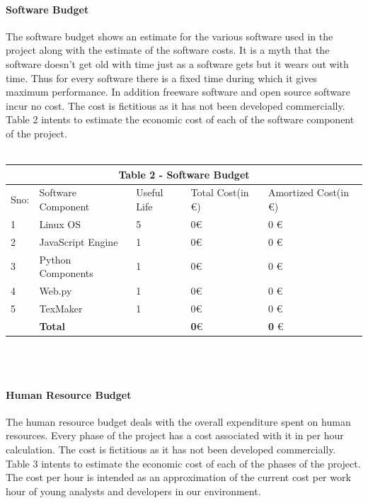 \paragraph{Software Budget}
The software budget shows an estimate for the various software used in the project along with
the estimate of the software costs. It is a myth that the software doesn’t get old with time just
as a software gets but it wears out with time. Thus for every software there is a fixed time
during which it gives maximum performance. In addition freeware software and open source
software incur no cost. The cost is fictitious as it has not been developed commercially. Table 2
intents to estimate the economic cost of each of the software component of the project.
\\ \\
\begin{tabular}{|p{1cm}||p{3cm}|p{2cm}|p{3cm}|p{3cm}|}
 \hline
 \multicolumn{5}{|c|}{Table 2 - Software Budget} \\
 \hline
 Sno: & Software Component&Useful Life &Total Cost(in \euro) &Amortized Cost(in \euro)\\
 \hline
1   & Linux OS  &5 &  0\euro  & 0 \euro \\
2   & JavaScript Engine  &1 &  0\euro  & 0 \euro \\
3   & Python Components  &1 &  0\euro  & 0 \euro \\
4   & Web.py  &1 &  0\euro  & 0 \euro \\
5   & TexMaker  &1 &  0\euro  & 0 \euro \\

\hline
\hline
   & \textbf{Total}  &  &  \textbf{0}\euro  & \textbf{0} \euro \\
 \hline
\end{tabular}
\\ \\ 
\paragraph{Human Resource Budget}
The human resource budget deals with the overall expenditure spent on human resources.
Every phase of the project has a cost associated with it in per hour calculation.
The cost is fictitious as it has not been developed commercially. Table 3 intents to estimate the
economic cost of each of the phases of the project. The cost per hour is intended as an
approximation of the current cost per work hour of young analysts and developers in our
environment.\\

